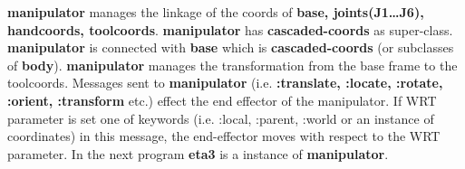 \begin{refdesc}




\end{refdesc}
{\bf manipulator} manages the linkage of the coords of 
{\bf base, joints(J1\ldots J6), handcoords, toolcoords}. 
{\bf manipulator} has {\bf cascaded-coords} as super-class. 
{\bf manipulator} is connected with {\bf base} which is {\bf cascaded-coords}
(or subclasses of {\bf body}). {\bf manipulator} manages the transformation from 
the base frame to the toolcoords. Messages sent to {\bf manipulator} 
(i.e. {\bf :translate, :locate, :rotate, :orient, :transform} etc.) effect 
the end effector of the manipulator. If WRT parameter is set one of keywords 
(i.e. :local, :parent, :world or an instance of coordinates) in this message, 
the end-effector  moves with respect to the WRT parameter. 
In the next program {\bf eta3} is a instance of {\bf manipulator}.



